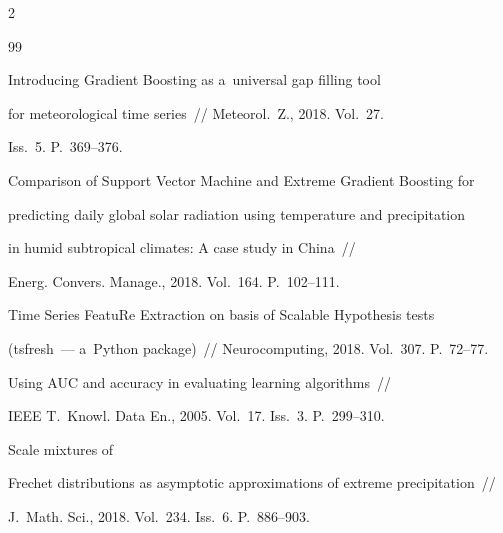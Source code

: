 \begin{multicols}{2}
{{\begin{thebibliography}{99}


Introducing Gradient Boosting as a~universal gap filling tool 

for meteorological time series~// Meteorol.~Z., 2018. Vol.~27. 

Iss.~5. P.~369--376.





Comparison of Support Vector Machine and Extreme Gradient Boosting for 

predicting daily global solar radiation using temperature and precipitation 

in humid subtropical climates: A case study in China~// 

Energ. Convers. Manage., 2018. Vol.~164. P.~102--111.





Time Series FeatuRe Extraction on basis of Scalable Hypothesis tests 

(tsfresh~--- a~Python package)~// Neurocomputing, 2018. Vol.~307. P.~72--77.




 Using AUC and accuracy in evaluating learning algorithms~// 

IEEE T.~Knowl. Data En., 2005. Vol.~17. Iss.~3. P.~299--310.

  


 Scale mixtures of

Frechet distributions as asymptotic approximations of extreme precipitation~// 

J.~Math. Sci., 2018. Vol.~234. Iss.~6. P.~886--903.



 \end{thebibliography}



 }

 }



\end{multicols}



